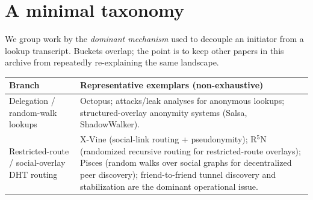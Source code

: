 \documentclass[11pt]{article}
\begin{document}
\section{A minimal taxonomy}
We group work by the \emph{dominant mechanism} used to decouple an initiator from a lookup transcript.
Buckets overlap; the point is to keep other papers in this archive from repeatedly re-explaining the same landscape.

\begin{table}[t]
\centering
\begin{tabularx}{\linewidth}{@{}lX@{}}
\toprule
Branch & Representative exemplars (non-exhaustive) \\
\midrule
Delegation / random-walk lookups & Octopus; attacks/leak analyses for anonymous lookups; structured-overlay anonymity systems (Salsa, ShadowWalker).\cite{octopus,wangborisovLookupCCS2010,rayZhangInfoLeak2007,mittal_tissec,salsa,shadowwalker} \\
Restricted-route / social-overlay DHT routing & X-Vine (social-link routing + pseudonymity); R$^{5}$N (randomized recursive routing for restricted-route overlays); Pisces (random walks over social graphs for decentralized peer discovery); friend-to-friend tunnel discovery and stabilization are the dominant operational issue.\cite{xvineNDSS2012,r5nNSS2011,r5nSpec2026,pisces} \\


\end{tabularx}
\end{table}
\end{document}
